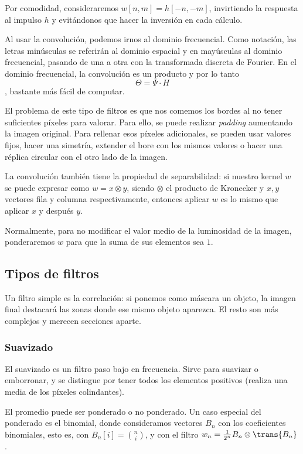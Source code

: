 \documentclass[nochap,palatino,notitlepage]{apuntes}
\begin{document}
Por comodidad, consideraremos $w[n,m] = h[-n, -m]$, invirtiendo la respuesta al impulso $h$ y evitándonos que hacer la inversión en cada cálculo.

Al usar la convolución, podemos irnos al dominio frecuencial. Como notación, las letras minúsculas se referirán al dominio espacial y en mayúsculas al dominio frecuencial, pasando de una a otra con la transformada discreta de Fourier. En el dominio frecuencial, la convolución es un producto y por lo tanto \[ Θ = Ψ \cdot H \], bastante más fácil de computar.

El problema de este tipo de filtros es que nos comemos los bordes al no tener suficientes píxeles para valorar. Para ello, se puede realizar \textit{padding} aumentando la imagen original. Para rellenar esos píxeles adicionales, se pueden usar valores fijos, hacer una simetría, extender el bore con los mismos valores o hacer una réplica circular con el otro lado de la imagen.

La convolución también tiene la propiedad de separabilidad: si nuestro kernel $w$ se puede expresar como $w = x \otimes y$, siendo $\otimes$ el producto de Kronecker y $x,y$ vectores fila y columna respectivamente, entonces aplicar $w$ es lo mismo que aplicar $x$ y después $y$.

Normalmente, para no modificar el valor medio de la luminosidad de la imagen, ponderaremos $w$ para que la suma de sus elementos sea $1$.

\subsection{Tipos de filtros}

Un filtro simple es la correlación: si ponemos como máscara un objeto, la imagen final destacará las zonas donde ese mismo objeto aparezca. El resto son más complejos y merecen secciones aparte.

\subsubsection{Suavizado}

El suavizado es un filtro paso bajo en frecuencia. Sirve para suavizar o emborronar, y se distingue por tener todos los elementos positivos (realiza una media de los píxeles colindantes).

El promedio puede ser ponderado o no ponderado. Un caso especial del ponderado es el binomial, donde consideramos vectores $B_n$ con los coeficientes binomiales, esto es, con $B_n[i] = {n \choose i}$, y con el filtro $w_n = \frac{1}{2^n} B_n \otimes \trans{B_n}$.
\end{document}

